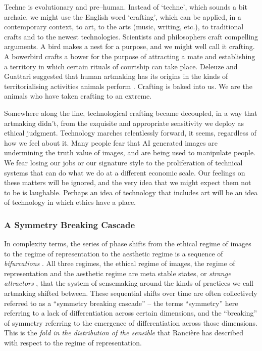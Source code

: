 \documentclass[letterpaper]{article}
\begin{document}
    Techne is evolutionary and pre–human. Instead of ‘techne’, which sounds a bit archaic, we might use the English word ‘crafting’, which can be applied, in a contemporary context, to art, to the arts (music, writing, etc.), to traditional crafts and to the newest technologies. Scientists and philosophers craft compelling arguments. A bird makes a nest for a purpose, and we might well call it crafting. A bowerbird crafts a bower for the purpose of attracting a mate and establishing a territory in which certain rituals of courtship can take place. Deleuze and Guattari suggested that human artmaking has its origins in the kinds of territorialising activities animals perform \citep[p.15]{GuattariChsmss1995}. Crafting is baked into us. We are the animals who have taken crafting to an extreme.

    Somewhere along the line, technological crafting became decoupled, in a way that artmaking didn't, from the exquisite and appropriate sensitivity we deploy as ethical judgment. Technology marches relentlessly forward, it seems, regardless of how we feel about it. Many people fear that AI generated images are undermining the truth value of images, and are being used to manipulate people. We fear losing our jobs or our signature style to the proliferation of technical systems that can do what we do at a different economic scale. Our feelings on these matters will be ignored, and the very idea that we might expect them not to be is laughable. Perhaps an idea of technology that includes art will be an idea of technology in which ethics have a place.
    
    \subsubsection{A Symmetry Breaking Cascade}

    In complexity terms, the series of phase shifts from the ethical regime of images to the regime of representation to the aesthetic regime is a sequence of \emph{bifurcations} \citep{LandauThryOfPhstrnstns1936}. All three regimes, the ethical regime of images, the regime of representation and the aesthetic regime are meta stable states, or \emph{strange attractors} \citep{RuelleTakensOnThNtrOfTrblnc1971}, that the system of sensemaking around the kinds of practices we call artmaking shifted between. These sequential shifts over time are often collectively referred to as a “symmetry breaking cascade” – the terms “symmetry” here referring to a lack of differentiation across certain dimensions, and the “breaking” of symmetry referring to the emergence of differentiation across those dimensions. This is the \emph{fold in the distribution of the sensible} that Rancière has described with respect to the regime of representation.
\end{document}
